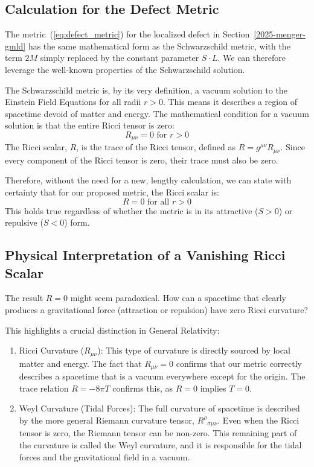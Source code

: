 \documentclass[%
  reprint,
  superscriptaddress,
  showpacs,
  showkeys,
  amsmath,amssymb,
  pra,
  longbibliography,
  floatfix,
  x11names
]{revtex4-2}
\begin{document}
\subsection{Calculation for the Defect Metric}

The metric~(\ref{eq:defect_metric}) for the localized defect in Section~\ref{2025-menger-gmld}
has the   same mathematical form  as the Schwarzschild metric, with the term $2M$ simply replaced by the constant parameter $S \cdot L$. We can therefore leverage the well-known properties of the Schwarzschild solution.

The Schwarzschild metric is, by its very definition, a {vacuum solution} to the Einstein Field Equations for all radii $r > 0$. This means it describes a region of spacetime devoid of matter and energy. The mathematical condition for a vacuum solution is that the entire Ricci tensor is zero:
\begin{equation}
    R_{\mu\nu} = 0 \text{ for } r > 0
\end{equation}
The Ricci scalar, $R$, is the trace of the Ricci tensor, defined as $R = g^{\mu\nu} R_{\mu\nu}$. Since every component of the Ricci tensor is zero, their trace must also be zero.

Therefore, without the need for a new, lengthy calculation, we can state with certainty that for our proposed metric, the Ricci scalar is:
\begin{equation}
     R = 0  \text{ for all } r > 0
\end{equation}
This holds true regardless of whether the metric is in its attractive ($S>0$) or repulsive ($S<0$) form.

\subsection{Physical Interpretation of a Vanishing Ricci Scalar}

The result $R=0$ might seem paradoxical. How can a spacetime that clearly produces a gravitational force (attraction or repulsion) have zero Ricci curvature?

This highlights a crucial distinction in General Relativity:
\begin{enumerate}
    \item {Ricci Curvature ($R_{\mu\nu}$):} This type of curvature is directly sourced by local matter and energy. The fact that $R_{\mu\nu}=0$ confirms that our metric correctly describes a spacetime that is a {vacuum} everywhere except for the origin. The trace relation $R = -8\pi T$ confirms this, as $R=0$ implies $T=0$.

    \item {Weyl Curvature (Tidal Forces):} The full curvature of spacetime is described by the more general Riemann curvature tensor, $R^\rho{}_{\sigma\mu\nu}$. Even when the Ricci tensor is zero, the Riemann tensor can be non-zero. This remaining part of the curvature is called the Weyl curvature, and it is responsible for the tidal forces and the gravitational field in a vacuum.
\end{enumerate}
\end{document}
